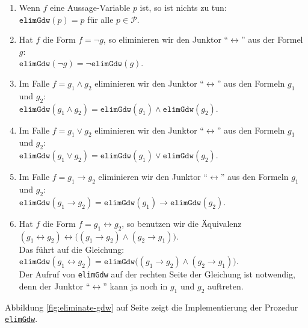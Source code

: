 \begin{enumerate}
\item Wenn $f$ eine
      Aussage-Variable $p$ ist, so ist nichts zu tun:
      \\[0.2cm]
      \hspace*{1.3cm}
      $\texttt{elimGdw}(p) = p$ \quad f\"{u}r alle $p \in \mathcal{P}$.
\item Hat $f$ die Form $f = \neg g$, so eliminieren wir den Junktor
      ``$\leftrightarrow$'' aus der Formel $g$: \\[0.2cm]
      \hspace*{1.3cm} 
      $\texttt{elimGdw}(\neg g) = \neg \texttt{elimGdw}(g)$.
\item Im Falle $f = g_1 \wedge g_2$ eliminieren wir den Junktor
      ``$\leftrightarrow$'' aus den Formeln $g_1$ und $g_2$: \\[0.2cm]
      \hspace*{1.3cm} 
      $\texttt{elimGdw}(g_1 \wedge g_2) = \texttt{elimGdw}(g_1) \wedge \texttt{elimGdw}(g_2)$.
\item Im Falle $f = g_1 \vee g_2$ eliminieren wir den Junktor
      ``$\leftrightarrow$'' aus den Formeln $g_1$ und $g_2$: \\[0.2cm]
      \hspace*{1.3cm} 
      $\texttt{elimGdw}(g_1 \vee g_2) = \texttt{elimGdw}(g_1) \vee \texttt{elimGdw}(g_2)$.
\item Im Falle $f = g_1 \rightarrow g_2$ eliminieren wir den Junktor
      ``$\leftrightarrow$'' aus den Formeln $g_1$ und $g_2$: \\[0.2cm]
      \hspace*{1.3cm} 
      $\texttt{elimGdw}(g_1 \rightarrow g_2) = \texttt{elimGdw}(g_1) \rightarrow \texttt{elimGdw}(g_2)$.
\item Hat $f$ die Form $f = g_1 \leftrightarrow g_2$, so benutzen wir die
      \"{A}quivalenz \\[0.2cm]
      \hspace*{1.3cm} 
      $(g_1 \leftrightarrow g_2) \leftrightarrow \bigl( (g_1 \rightarrow g_2) \wedge (g_2 \rightarrow g_1)\bigr)$.
      \\[0.2cm]
      Das f\"{u}hrt auf die Gleichung:
      \\[0.2cm]
      \hspace*{1.3cm} 
      $\texttt{elimGdw}(g_1 \leftrightarrow g_2) = \texttt{elimGdw}\bigl( (g_1 \rightarrow g_2) \wedge (g_2 \rightarrow g_1)\bigr)$. 
      \\[0.2cm]
      Der Aufruf von \texttt{elimGdw} auf der rechten Seite der Gleichung ist notwendig,
      denn der Junktor ``$\leftrightarrow$'' kann ja noch in $g_1$ und $g_2$ auftreten.
\end{enumerate}
Abbildung
\ref{fig:eliminate-gdw} auf Seite \pageref{fig:eliminate-gdw} zeigt die Implementierung der
Prozedur 
\href{https://github.com/karlstroetmann/Logik/blob/master/SetlX/knf.stlx}{\texttt{elimGdw}}.

